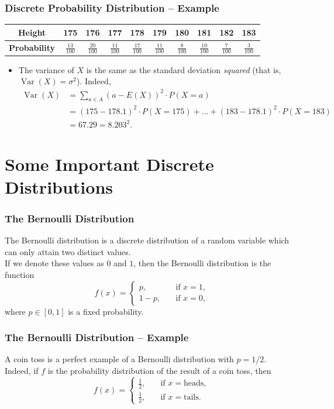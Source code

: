 \documentclass[aspectratio=169,11pt,usenames,dvipsnames]{beamer}
\DeclareMathOperator{\var}{Var}
\begin{document}
\begin{frame}
 \frametitle{Discrete Probability Distribution -- Example}
 \begin{center}
  \begin{tabular}{c|ccccccccc}
   \textbf{Height} & 175 & 176 & 177 & 178 & 179 & 180 & 181 & 182 & 183\\
   \midrule
   \textbf{Probability} & $\frac{13}{100}$ & $\frac{20}{100}$ & $\frac{11}{100}$
                        & $\frac{17}{100}$ & $\frac{11}{100}$ & $\frac{8}{100}$
                        & $\frac{10}{100}$ & $\frac{7}{100}$ & $\frac{3}{100}$
  \end{tabular}
 \end{center}
 \begin{itemize}
  \item The \alert{variance} of $X$ is the same as the standard deviation
   \emph{squared} (that is, $\var(X) = \sigma^2$). Indeed,
   \begin{align*}
    \var(X) &= \sum_{a \in A} (a - E(X))^2 \cdot P(X = a)\\
            &= (175 - 178.1)^2 \cdot P(X = 175) + \ldots + (183 - 178.1)^2 \cdot
            P(X = 183)\\
            &= 67.29 = 8.203^2.
   \end{align*}
 \end{itemize}
\end{frame}

\section{Some Important Discrete Distributions}

\begin{frame}
 \frametitle{The Bernoulli Distribution}
 The \alert{Bernoulli} distribution is a discrete distribution of a random
 variable which can only attain \alert{two distinct values}.\\ \pause
 If we denote these values as $0$ and $1$, then the Bernoulli distribution is
 the function
 \[
  f(x) = \begin{cases}
   p, \quad &\text{if } x = 1,\\
   1 - p, \quad &\text{if } x = 0,
  \end{cases}
 \]
 where $p \in [0,1]$ is a \alert{fixed} probability.
\end{frame}

\begin{frame}
 \frametitle{The Bernoulli Distribution -- Example}
 A \alert{coin toss} is a perfect example of a Bernoulli distribution with $p =
 1 / 2$. \\ \pause
 Indeed, if $f$ is the probability distribution of the result of a coin toss,
 then
 \[
  f(x) = 
  \begin{cases}
   \frac{1}{2}, \quad &\text{if } x = \text{heads},\\
   \frac{1}{2}, \quad &\text{if } x = \text{tails}.
  \end{cases}
 \]
\end{frame}
\end{document}
